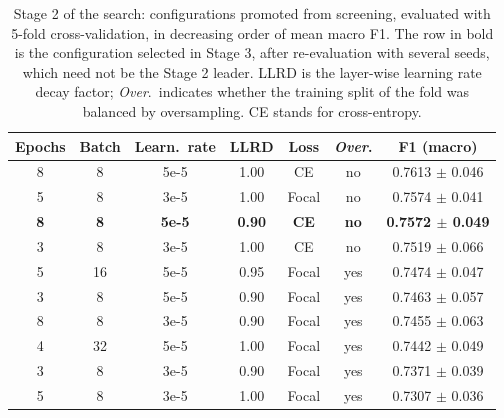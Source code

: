 \begin{table}[!t]
\centering
\caption{Stage 2 of the search: configurations promoted from screening, evaluated with 5-fold cross-validation, in decreasing order of mean macro F1. The row in bold is the configuration selected in Stage 3, after re-evaluation with several seeds, which need not be the Stage 2 leader. LLRD is the layer-wise learning rate decay factor; \emph{Over}.\ indicates whether the training split of the fold was balanced by oversampling. CE stands for cross-entropy.}
\label{tab:halving}
\begin{tabular}{ccccccc}
\toprule
Epochs & Batch & Learn.\ rate & LLRD & Loss & \emph{Over}. & F1 (macro) \\
\midrule
8 & 8 & 5e-5 & 1.00 & CE & no & 0.7613 $\pm$ 0.046 \\
5 & 8 & 3e-5 & 1.00 & Focal & no & 0.7574 $\pm$ 0.041 \\
\textbf{8} & \textbf{8} & \textbf{5e-5} & \textbf{0.90} & \textbf{CE} & \textbf{no} & \textbf{0.7572 $\pm$ 0.049} \\
3 & 8 & 3e-5 & 1.00 & CE & no & 0.7519 $\pm$ 0.066 \\
5 & 16 & 5e-5 & 0.95 & Focal & yes & 0.7474 $\pm$ 0.047 \\
3 & 8 & 5e-5 & 0.90 & Focal & yes & 0.7463 $\pm$ 0.057 \\
8 & 8 & 3e-5 & 0.90 & Focal & yes & 0.7455 $\pm$ 0.063 \\
4 & 32 & 5e-5 & 1.00 & Focal & yes & 0.7442 $\pm$ 0.049 \\
3 & 8 & 3e-5 & 0.90 & Focal & yes & 0.7371 $\pm$ 0.039 \\
5 & 8 & 3e-5 & 1.00 & Focal & yes & 0.7307 $\pm$ 0.036 \\
\bottomrule
\end{tabular}
\end{table}
